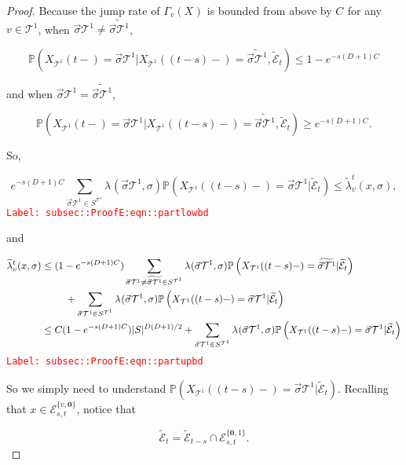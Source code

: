 \documentclass[12pt]{article}
\newcommand{\mb}{\mathbb}
\newcommand{\mc}{\mathcal}
\newcommand{\tr}{\textcolor{red}}
\newcommand{\labe}[1]{\tr{\texttt{Label: #1}}}
\newcommand{\pr}{\mb{P}}							%
\renewcommand{\root}{\mathbf{0}}				%
\renewcommand{\v}{v}							%
\renewcommand{\S}{S}							%
\newcommand{\s}{\sigma}							%
\newcommand{\sv}{\vec{\s}}						%
\newcommand{\x}{x}								%
\renewcommand{\t}{t}							%
\renewcommand{\tt}{s}							%
\newcommand{\degr}{D}								%
\newcommand{\pup}[1]{^{#1}}							%
\newcommand{\tree}{\mc{T}}							%
\newcommand{\XState}[1]{\S^{#1}}				%
\newcommand{\rxvt}[2]{X_{#1}{(#2)}}					%
\newcommand{\rxvts}[2]{X_{#1}{#2}}					%
\newcommand{\rate}[1]{\lambda_{#1}}					%
\newcommand{\crate}[2]{\alt{\lambda}_{#1}^{#2}}		%
\newcommand{\const}[1]{C_{#1}}						%
\newcommand{\alt}{\widetilde}						%
\newcommand{\evnt}{\mc{E}}						%
\newcommand{\pmap}[1]{\Gamma_{#1}}				%
\begin{document}
\begin{proof}
Because the jump rate of \(\pmap{\v}(\rxvts{}{})\) is bounded from above by \(\const{}\) for any \(\v\in\tree\pup{1}\),  when \(\sv{}{\tree\pup{1}}\neq\alt{\sv{}{\tree\pup{1}}}\), 

\[\pr\left(\rxvt{\tree\pup{1}}{\t-} = \sv{}{\tree\pup{1}}|\rxvt{\tree\pup{1}}{(\t-\tt)-}=\alt{\sv{}{\tree\pup{1}}},\alt{\evnt}_\t\right) \leq 1-e^{-\tt(\degr+1)\const{}}\]

and when \(\sv{}{\tree\pup{1}}=\alt{\sv{}{\tree\pup{1}}}\),

\[\pr\left(\rxvt{\tree\pup{1}}{\t-} = \sv{}{\tree\pup{1}}|\rxvt{\tree\pup{1}}{(\t-\tt)-}=\alt{\sv{}{\tree\pup{1}}},\alt{\evnt}_\t\right) \geq e^{-\tt(\degr+1)\const{}}.\]

So,

\begin{equation}
e^{-\tt(\degr+1)\const{}}\sum_{\sv{}{\tree\pup{1}}\in \S^{\tree\pup{1}}} \rate{}(\sv{}{\tree\pup{1}},\s)\pr\left(\rxvt{\tree\pup{1}}{(\t-\tt)-}=\sv{}{\tree\pup{1}}|\alt{\evnt}_\t\right) \leq \crate{\v}{\t}(\x{}{},\s),
\label{subsec::ProofE:eqn::partlowbd}
\end{equation}
\labe{subsec::ProofE:eqn::partlowbd}

and

\begin{align}
\crate{\v}{\t}(\x{}{},\s)&\leq (1 - e^{-\tt(\degr+1)\const{}})\sum_{\sv{}{\tree\pup{1}}\neq \alt{\sv{}{\tree\pup{1}}} \in \S^{\tree\pup{1}}} \rate{}(\sv{}{\tree\pup{1}},\s)\pr\left(\rxvt{\tree\pup{1}}{(\t-\tt)-}=\alt{\sv{}{\tree\pup{1}}}|\alt{\evnt}_\t\right)\nonumber\\
&\hspace{24 pt} +\sum_{\sv{}{\tree\pup{1}} \in \S^{\tree\pup{1}}} \rate{}(\sv{}{\tree\pup{1}},\s)\pr\left(\rxvt{\tree\pup{1}}{(\t-\tt)-}=\sv{}{\tree\pup{1}}|\alt{\evnt}_\t\right)\nonumber\\
&\leq \const{}(1 - e^{-\tt(\degr+1)\const{}})|\S|^{\degr(\degr+1)/2} + \sum_{\sv{}{\tree\pup{1}} \in \S^{\tree\pup{1}}} \rate{}(\sv{}{\tree\pup{1}},\s)\pr\left(\rxvt{\tree\pup{1}}{(\t-\tt)-}=\sv{}{\tree\pup{1}}|\alt{\evnt}_\t\right)
\label{subsec::ProofE:eqn::partupbd}
\end{align}
\labe{subsec::ProofE:eqn::partupbd}

So we simply need to understand \(\pr\left(\rxvt{\tree\pup{1}}{(\t-\tt)-}=\sv{}{\tree\pup{1}}|\alt{\evnt}_\t\right)\). Recalling that \(\x{}{} \in \evnt^{\{\v,\root\}}_{\tt,\t}\), notice that

\[\alt{\evnt}_\t = \alt{\evnt}_{\t-\tt}\cap \evnt^{\{\root,1\}}_{\tt,\t}.\]


\end{proof}
\end{document}
